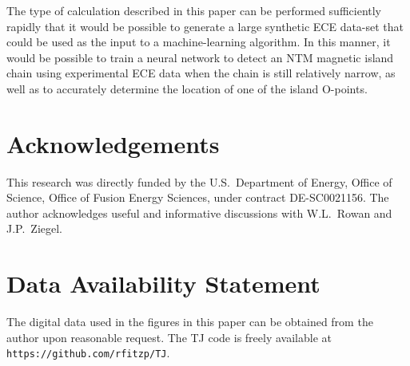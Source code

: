 \documentclass[12pt,prb,aps]{revtex4-1}
\begin{document}
The type of calculation described in this paper can be performed sufficiently rapidly that it would be possible to generate a large synthetic ECE data-set
that could be used as the input to a machine-learning algorithm. In this manner, it would be possible to train a neural network to  detect an NTM magnetic
island chain using experimental ECE data when the chain is still relatively narrow, as well as to accurately determine the location of one of the island O-points. 

\section*{Acknowledgements}
This research was directly funded by the U.S.\ Department of Energy, Office of Science, Office of Fusion Energy Sciences, under  contract DE-SC0021156. 
The author acknowledges useful and informative discussions with W.L.~Rowan and J.P.~Ziegel. 

\section*{Data Availability Statement}
The digital data used in the figures in this paper can be obtained from the author upon reasonable request. The TJ code is freely 
available at {\tt https://github.com/rfitzp/TJ}. 
\end{document}
